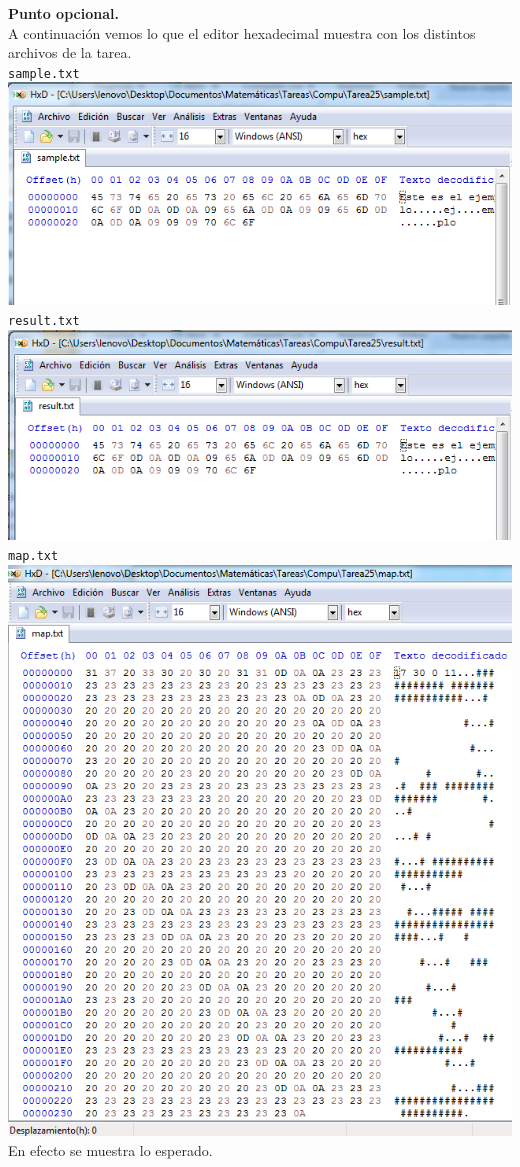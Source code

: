 \documentclass[12pt]{article}
\begin{document}
\textbf{Punto opcional.}\\

A continuación vemos lo que el editor hexadecimal muestra con los distintos archivos de la tarea.\\

\texttt{sample.txt}\\

\includegraphics[width = \textwidth]{sam}\\

\texttt{result.txt}\\

\includegraphics[width = \textwidth]{res}\\

\texttt{map.txt}\\

\includegraphics[width = \textwidth]{m}\\

En efecto se muestra lo esperado.\\
\end{document}
